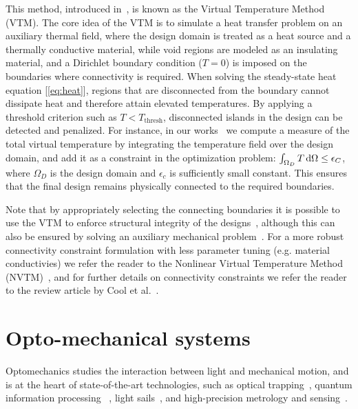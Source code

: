 This method, introduced in~\cite{li_structural_2016}, is known as the Virtual Temperature
Method (VTM). The core idea of the VTM is to simulate a heat transfer problem on an auxiliary thermal field, where the design 
domain is treated as a heat source and a thermally conductive material, while void regions are modeled as an
insulating material, and a Dirichlet boundary condition ($T = 0$) is imposed on the boundaries where connectivity is required. When 
solving the steady-state heat equation [\eqref{eq:heat}], regions that are disconnected from the boundary 
cannot dissipate heat and therefore attain elevated temperatures. By applying a threshold criterion such as $T < T_\text{thresh}$, disconnected islands in the design can be 
detected and penalized. For instance, in our works~\cite{ownpub1,ownpub2} we compute a measure of the total virtual temperature
by integrating the temperature field over the design domain, and add it as a constraint in the optimization problem:
$\int_{\Omega_D} T \mathop{}\!\text{d} \Omega \leq \epsilon_C$, where $\Omega_D$ is the design domain and $\epsilon_c$ is sufficiently small constant. This ensures that the final design remains physically connected to the required 
boundaries. 


Note that by appropriately selecting the connecting boundaries it is possible to use the VTM to enforce
structural integrity of the designs~\cite{structural_heat}, although this can also be ensured by solving an auxiliary
mechanical problem~\cite{structural_integrity}. For a more robust connectivity constraint formulation with less parameter tuning (e.g. material conductivies) we refer the reader to the Nonlinear 
Virtual Temperature Method (NVTM)~\cite{nvtm}, and for further details on connectivity constraints we refer the reader to the review 
article by Cool et al.~\cite{vanessa}.

\section{Opto-mechanical systems~\cite{ownpub1,ownpub2,ownpub3}}

Optomechanics studies the interaction between light and mechanical motion, and is at the heart of state-of-the-art technologies, such as 
optical trapping~\cite{ashkin_acceleration_1970, moffitt_recent_2008}, quantum information processing~\cite{Andrews_2014, Xi_2025}
, light sails~\cite{lightsail, lightsail1}, and high-precision metrology and sensing~\cite{sensing, weakforce, Li:18, Mason_2019}.

